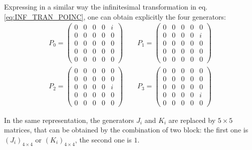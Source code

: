 \documentclass[../../main/main.tex]{subfiles}
\begin{document}
Expressing in a similar way the infinitesimal transformation in eq. \ref{eq:INF_TRAN_POINC}, one can obtain explicitly the four generators:
\begin{equation}
    \begin{gathered}
        P_0 =
        \begin{pmatrix}
        0   & 0  & 0  & 0 & i \\
        0   & 0  & 0  & 0 & 0 \\
        0   & 0  & 0  & 0 & 0 \\
        0   & 0  & 0  & 0 & 0 \\
        0   & 0  & 0  & 0 & 0
        \end{pmatrix}
        \qquad
        P_1 =
        \begin{pmatrix}
        0   & 0  & 0  & 0 & 0 \\
        0   & 0  & 0  & 0 & i \\
        0   & 0  & 0  & 0 & 0 \\
        0   & 0  & 0  & 0 & 0 \\
        0   & 0  & 0  & 0 & 0
        \end{pmatrix}   \\
        P_2 =
        \begin{pmatrix}
        0   & 0  & 0  & 0 & 0 \\
        0   & 0  & 0  & 0 & 0 \\
        0   & 0  & 0  & 0 & i \\
        0   & 0  & 0  & 0 & 0 \\
        0   & 0  & 0  & 0 & 0
        \end{pmatrix}
        \qquad
        P_3 =
        \begin{pmatrix}
        0   & 0  & 0  & 0 & 0 \\
        0   & 0  & 0  & 0 & 0 \\
        0   & 0  & 0  & 0 & 0 \\
        0   & 0  & 0  & 0 & i \\
        0   & 0  & 0  & 0 & 0
        \end{pmatrix}
    \end{gathered}
    \label{eq:}
\end{equation}

In the same representation, the generators \( J_i \) and \( K_i \) are replaced by \( 5 \times 5\) matrices, that can be obtained by the combination of two block: the first one is \( (J_i)_{4 \times 4} \) or \( (K_i)_{4 \times 4} \), the second one is \( 1 \).
\end{document}
